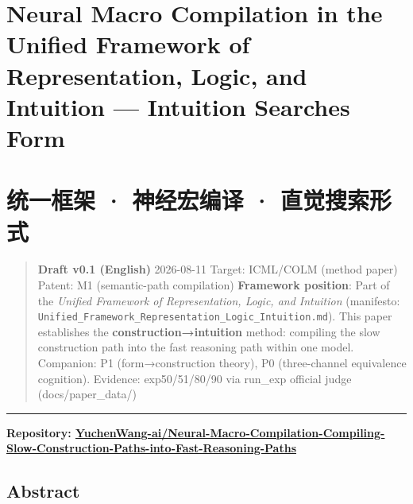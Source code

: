 \documentclass[
]{article}
\author{}
\date{}
\begin{document}
\section{Neural Macro Compilation in the Unified Framework of
Representation, Logic, and Intuition --- Intuition Searches
Form}\label{neural-macro-compilation-in-the-unified-framework-of-representation-logic-and-intuition-intuition-searches-form}

\section{统一框架 · 神经宏编译 ·
直觉搜索形式}\label{ux7edfux4e00ux6846ux67b6-ux795eux7ecfux5b8fux7f16ux8bd1-ux76f4ux89c9ux641cux7d22ux5f62ux5f0f}

\begin{quote}
\textbf{Draft v0.1 (English)} \textbar{} 2026-08-11 Target: ICML/COLM
(method paper) \textbar{} Patent: M1 (semantic-path compilation)
\textbf{Framework position}: Part of the \emph{Unified Framework of
Representation, Logic, and Intuition} (manifesto:
\texttt{Unified\_Framework\_Representation\_Logic\_Intuition.md}). This
paper establishes the \textbf{construction→intuition} method: compiling
the slow construction path into the fast reasoning path within one
model. Companion: P1 (form→construction theory), P0 (three-channel
equivalence cognition). Evidence: exp50/51/80/90 via run\_exp official
judge (docs/paper\_data/)
\end{quote}

\begin{center}\rule{0.5\linewidth}{0.5pt}\end{center}

\textbf{Repository:
\href{https://github.com/YuchenWang-ai/Neural-Macro-Compilation-Compiling-Slow-Construction-Paths-into-Fast-Reasoning-Paths}{YuchenWang-ai/Neural-Macro-Compilation-Compiling-Slow-Construction-Paths-into-Fast-Reasoning-Paths}}

\subsection{Abstract}\label{abstract}
\end{document}
